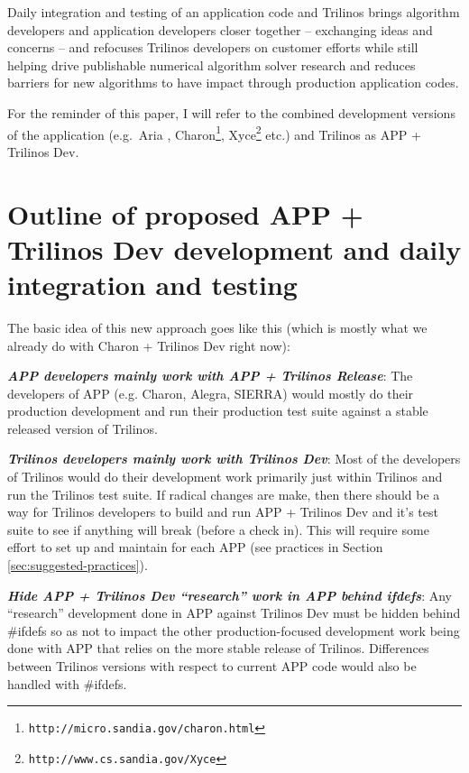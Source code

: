 \documentclass[pdf,ps2pdf,11pt]{SANDreport}
\begin{document}
Daily integration and testing of an application code and Trilinos
brings algorithm developers and application developers closer together --
exchanging ideas and concerns -- and refocuses Trilinos developers on customer 
efforts while still helping drive publishable numerical algorithm solver
research and reduces barriers for new algorithms to have impact through
production application codes.

For the reminder of this paper, I will refer to the combined development
versions of the application (e.g.\ Aria {}\cite{ref:aria-sierra},
Charon\footnote{\texttt{http://micro.sandia.gov/charon.html}},
Xyce\footnote{\texttt{http://www.cs.sandia.gov/Xyce}} etc.) and Trilinos as
APP + Trilinos Dev.


%
{}\section{Outline of proposed APP + Trilinos Dev development and daily
integration and testing}
%

The basic idea of this new approach goes like this (which is mostly what we
already do with Charon + Trilinos Dev right now):

{}\textit{\textbf{APP developers mainly work with APP + Trilinos Release}}:
The developers of APP (e.g. Charon, Alegra, SIERRA) would mostly do their
production development and run their production test suite against a stable
released version of Trilinos.

{}\textit{\textbf{Trilinos developers mainly work with Trilinos Dev}}: Most of
the developers of Trilinos would do their development work primarily just within
Trilinos and run the Trilinos test suite.  If radical changes are make, then
there should be a way for Trilinos developers to build and run APP + Trilinos
Dev and it's test suite to see if anything will break (before a check in).
This will require some effort to set up and maintain for each APP (see
practices in Section {}\ref{sec:suggested-practices}).

{}\textit{\textbf{Hide APP + Trilinos Dev ``research'' work in APP behind
ifdefs}}: Any ``research'' development done in APP against Trilinos Dev must
be hidden behind {}\#ifdefs so as not to impact the other production-focused
development work being done with APP that relies on the more stable release of
Trilinos.  Differences between Trilinos versions with respect to current APP
code would also be handled with {}\#ifdefs.
\end{document}
